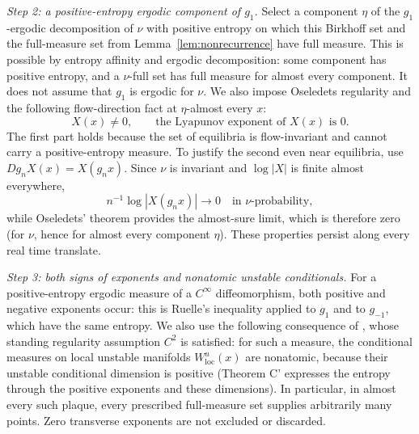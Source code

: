 \documentclass[12pt]{article}
\theoremstyle{remark}
\begin{document}
\emph{Step 2: a positive-entropy ergodic component of \(g_1\).}
Select a component \(\eta\) of the \(g_1\)-ergodic decomposition of
\(\nu\) with positive entropy on
which this Birkhoff set and the full-measure set from
Lemma~\ref{lem:nonrecurrence} have full measure.
This is possible by entropy affinity and ergodic decomposition:
some component has positive entropy, and a \(\nu\)-full set has full
measure for almost every component.
It does not assume that \(g_1\) is ergodic for \(\nu\).
We also impose Oseledets regularity and the following
flow-direction fact at \(\eta\)-almost every \(x\):
\begin{equation}\label{eq:flow-exponent}
 X(x)\ne0,\qquad
 \text{the Lyapunov exponent of }X(x)\text{ is }0.
\end{equation}
The first part holds because the set of equilibria is flow-invariant
and cannot carry a positive-entropy measure.  To justify the second
even near equilibria, use \(Dg_nX(x)=X(g_nx)\).
Since \(\nu\) is invariant and \(\log|X|\) is finite almost
everywhere,
\[
 n^{-1}\log|X(g_nx)|\longrightarrow0
                  \quad\text{in }\nu\text{-probability},
\]
while Oseledets' theorem provides the almost-sure limit, which is
therefore zero (for \(\nu\), hence for almost every component
\(\eta\)).
These properties persist along every real time translate.

\emph{Step 3: both signs of exponents and nonatomic unstable
conditionals.}
For a positive-entropy ergodic measure of a \(C^\infty\)
diffeomorphism, both positive and negative exponents occur: this is
Ruelle's inequality \cite{Ruelle1978} applied to \(g_1\) and to
\(g_{-1}\), which have the same entropy.
We also use the following consequence of
\cite[Corollary 7.2.2 and Theorem C']{LedrappierYoung1985II}, whose
standing regularity assumption \(C^2\) is satisfied: for such a
measure, the conditional measures on local unstable manifolds
\(W^u_{\mathrm{loc}}(x)\) are nonatomic, because their unstable
conditional dimension is positive (Theorem C' expresses the entropy
through the positive exponents and these dimensions).
In particular, in almost every such plaque, every prescribed
full-measure set supplies arbitrarily many points.
Zero transverse exponents are not excluded or discarded.
\end{document}
